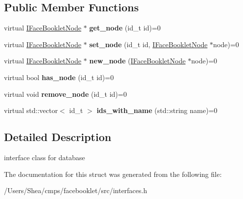 \subsection*{Public Member Functions}
\begin{DoxyCompactItemize}
\item 
\hypertarget{structfb_1_1_i_database_a6128a76b04dcba70edb9a255022cead6}{virtual \hyperlink{structfb_1_1_i_face_booklet_node}{I\+Face\+Booklet\+Node} $\ast$ {\bfseries get\+\_\+node} (id\+\_\+t id)=0}\label{structfb_1_1_i_database_a6128a76b04dcba70edb9a255022cead6}

\item 
\hypertarget{structfb_1_1_i_database_a5df6b867a93ea59915fe1320f3893dee}{virtual \hyperlink{structfb_1_1_i_face_booklet_node}{I\+Face\+Booklet\+Node} $\ast$ {\bfseries set\+\_\+node} (id\+\_\+t id, \hyperlink{structfb_1_1_i_face_booklet_node}{I\+Face\+Booklet\+Node} $\ast$node)=0}\label{structfb_1_1_i_database_a5df6b867a93ea59915fe1320f3893dee}

\item 
\hypertarget{structfb_1_1_i_database_a0730671dc9249402f8ff2493c15c0890}{virtual \hyperlink{structfb_1_1_i_face_booklet_node}{I\+Face\+Booklet\+Node} $\ast$ {\bfseries new\+\_\+node} (\hyperlink{structfb_1_1_i_face_booklet_node}{I\+Face\+Booklet\+Node} $\ast$node)=0}\label{structfb_1_1_i_database_a0730671dc9249402f8ff2493c15c0890}

\item 
\hypertarget{structfb_1_1_i_database_a0d4137ac3c63faf1ce90766d5a664387}{virtual bool {\bfseries has\+\_\+node} (id\+\_\+t id)=0}\label{structfb_1_1_i_database_a0d4137ac3c63faf1ce90766d5a664387}

\item 
\hypertarget{structfb_1_1_i_database_a4388eed63a243d78b03c6ae301c96b2d}{virtual void {\bfseries remove\+\_\+node} (id\+\_\+t id)=0}\label{structfb_1_1_i_database_a4388eed63a243d78b03c6ae301c96b2d}

\item 
\hypertarget{structfb_1_1_i_database_a0c55a808953dec94d0e91f478bd8f93a}{virtual std\+::vector$<$ id\+\_\+t $>$ {\bfseries ids\+\_\+with\+\_\+name} (std\+::string name)=0}\label{structfb_1_1_i_database_a0c55a808953dec94d0e91f478bd8f93a}

\end{DoxyCompactItemize}


\subsection{Detailed Description}
interface class for database 

The documentation for this struct was generated from the following file\+:\begin{DoxyCompactItemize}
\item 
/\+Users/\+Shea/cmps/facebooklet/src/interfaces.\+h\end{DoxyCompactItemize}
